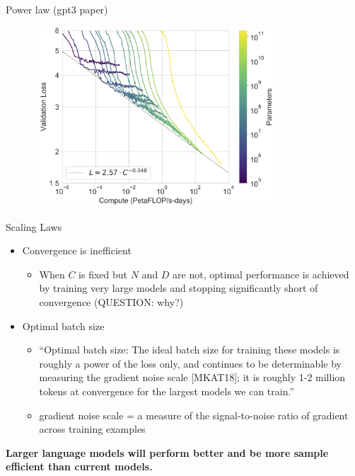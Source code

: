\begin{vbframe}{Power law (gpt3 paper)}

\vfill

\begin{figure}
	\centering
	\includegraphics[width = 9cm]{./figure/losscompute}
\end{figure}

\vfill

\end{vbframe}



\begin{vbframe}{Scaling Laws}

\vfill

\begin{itemize}

	\item Convergence is inefficient
	\begin{itemize}
	\item When $C$ is fixed but $N$ and $D$ are not,
	optimal performance is achieved by training very
	large models and stopping significantly short of
	convergence (QUESTION: why?)  
	\end{itemize}

	\item Optimal batch size \qmark
	\begin{itemize}
\item ``Optimal batch size: The ideal batch size for training these
	models is roughly a power of the loss only, and
	continues to be determinable by measuring the
	gradient noise scale [MKAT18]; it is roughly 1-2
	million tokens at convergence for the largest models
	we can train.''
        \item gradient noise scale = a measure of the signal-to-noise
	ratio of gradient across training examples
	\end{itemize}

\end{itemize}

\vskip3mm

\textbf{Larger language models will perform better and be
	more sample efficient than current models. \qmark} 

\vfill

\end{vbframe}

